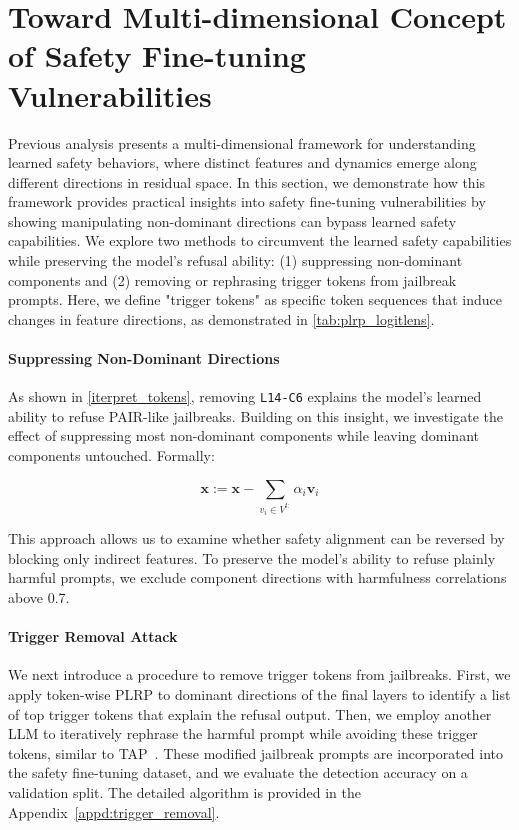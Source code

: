 \section{Toward Multi-dimensional Concept of Safety Fine-tuning Vulnerabilities}
\label{sec:application}

Previous analysis presents a multi-dimensional framework for understanding learned safety behaviors, where distinct features and dynamics emerge along different directions in residual space. In this section, we demonstrate how this framework provides practical insights into safety fine-tuning vulnerabilities by showing manipulating non-dominant directions can bypass learned safety capabilities. We explore two methods to circumvent the learned safety capabilities while preserving the model's refusal ability: (1) suppressing non-dominant components and (2) removing or rephrasing trigger tokens from jailbreak prompts. Here, we define "trigger tokens" as specific token sequences that induce changes in feature directions, as demonstrated in \autoref{tab:plrp_logitlens}.

\paragraph{Suppressing Non-Dominant Directions}
As shown in \autoref{iterpret_tokens}, removing \texttt{L14-C6} explains the model's learned ability to refuse PAIR-like jailbreaks. Building on this insight, we investigate the effect of suppressing most non-dominant components while leaving dominant components untouched. Formally:

\[
    \mathbf{x} := \mathbf{x} - \sum_{v_i \in V^{t:}} \alpha_i \mathbf{v}_i
    \label{eq:intervene_all}
\]

This approach allows us to examine whether safety alignment can be reversed by blocking only indirect features. To preserve the model's ability to refuse plainly harmful prompts, we exclude component directions with harmfulness correlations above 0.7. 


\paragraph{Trigger Removal Attack}
We next introduce a procedure to remove trigger tokens from jailbreaks. First, we apply token-wise PLRP to dominant directions of the final layers to identify a list of top trigger tokens that explain the refusal output. Then, we employ another LLM to iteratively rephrase the harmful prompt while avoiding these trigger tokens, similar to TAP~\cite{mehrotra2023tree}. These modified jailbreak prompts are incorporated into the safety fine-tuning dataset, and we evaluate the detection accuracy on a validation split. The detailed algorithm is provided in the Appendix~\ref{appd:trigger_removal}.

